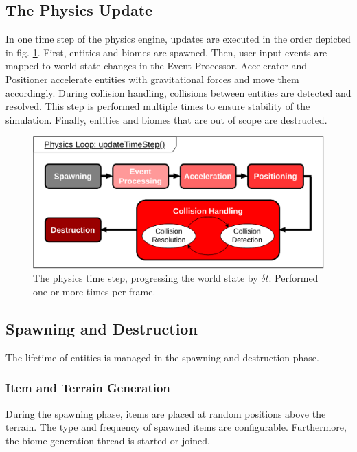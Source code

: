 \vspace{-\abovedisplayskip}
\subsection{The Physics Update}

In one time step of the physics engine, updates are executed in the order depicted in fig. \ref{fig:physicsLoop}.
First, entities and biomes are spawned.
Then, user input events are mapped to world state changes in the Event Processor.
Accelerator and Positioner accelerate entities with gravitational forces and move them accordingly.
During collision handling, collisions between entities are detected and resolved.
This step is performed multiple times to ensure stability of the simulation.
Finally, entities and biomes that are out of scope are destructed.

\vspace{-\abovedisplayskip}
\begin{figure}[h!]
  \centering
  \includegraphics[width = \linewidth]{figures/physics/updateTimeStep.pdf}
  \caption{The physics time step, progressing the world state by $\delta t$. Performed one or more times per frame.}
  \label{fig:physicsLoop}
\end{figure}
\vspace{-\belowdisplayskip}

\subsection{Spawning and Destruction}
The lifetime of entities is managed in the spawning and destruction phase.

\subsubsection{Item and Terrain Generation}

During the spawning phase, items are placed at random positions above the terrain.
The type and frequency of spawned items are configurable.
Furthermore, the biome generation thread is started or joined. %


